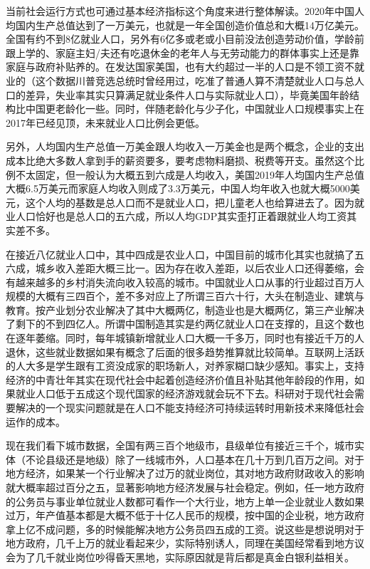 \documentclass[]{tufte-book}
\begin{document}
当前社会运行方式也可通过基本经济指标这个角度来进行整体解读。2020年中国人均国内生产总值达到了一万美元，也就是一年全国创造价值总和大概14万亿美元。全国有约不到8亿就业人口，另外有6亿多或老或小目前没法创造劳动价值，学龄前跟上学的、家庭主妇/夫还有吃退休金的老年人与无劳动能力的群体事实上还是靠家庭与政府补贴养的。在发达国家美国，也有大约超过一半的人口是不领工资不就业的（这个数据川普竞选总统时曾经用过，吃准了普通人算不清楚就业人口与总人口的差异，失业率其实只算满足就业条件人口与实际就业人口），毕竟美国年龄结构比中国更老龄化一些。同时，伴随老龄化与少子化，中国就业人口规模事实上在2017年已经见顶，未来就业人口比例会更低。

另外，人均国内生产总值一万美金跟人均收入一万美金也是两个概念，企业的支出成本比绝大多数人拿到手的薪资要多，要考虑物料磨损、税费等开支。虽然这个比例不太固定，但一般认为大概五到六成是人均收入，美国2019年人均国内生产总值大概6.5万美元而家庭人均收入则成了3.3万美元，中国人均年收入也就大概5000美元，这个人均的基数是总人口而不是就业人口，把儿童老人也给算进去了。因为就业人口恰好也是总人口的五六成，所以人均GDP其实歪打正着跟就业人均工资其实差不多。

在接近八亿就业人口中，其中四成是农业人口，中国目前的城市化其实也就搞了五六成，城乡收入差距大概三比一。因为存在收入差距，以后农业人口还得萎缩，会有越来越多的乡村消失流向收入较高的城市。中国就业人口从事的行业超过百万人规模的大概有三四百个，差不多对应上了所谓三百六十行，大头在制造业、建筑与教育。按产业划分农业解决了其中大概两亿，制造业也是大概两亿，第三产业解决了剩下的不到四亿人。所谓中国制造其实是约两亿就业人口在支撑的，且这个数也在逐年萎缩。同时，每年城镇新增就业人口大概一千多万，同时也有接近千万的人退休，这些就业数据如果有概念了后面的很多趋势推算就比较简单。互联网上活跃的人大多是学生跟有工资没成家的职场新人，对养家糊口缺少感知。事实上，支持经济的中青壮年其实在现代社会中起着创造经济价值且补贴其他年龄段的作用，如果就业人口低于五成这个现代国家的经济游戏就会玩不下去。科研对于现代社会需要解决的一个现实问题就是在人口不能支持经济可持续运转时用新技术来降低社会运作的成本。

现在我们看下城市数据，全国有两三百个地级市，县级单位有接近三千个，城市实体（不论县级还是地级）除了一线城市外，人口基本在几十万到几百万之间。对于地方经济，如果某一个行业解决了过万的就业岗位，其对地方政府财政收入的影响就大概率超过百分之五，显著影响地方经济发展与社会稳定。例如，任一地方政府的公务员与事业单位就业人数都可看作一个大行业，地方上单一企业就业人数如果过万，年产值基本都是大概不低于十亿人民币的规模，按中国的企业税，地方政府拿上亿不成问题，多的时候能解决地方公务员四五成的工资。说这些是想说明对于地方政府，几千上万的就业看起来少，实际特别诱人，同理在美国经常看到地方议会为了几千就业岗位吵得昏天黑地，实际原因就是背后都是真金白银利益相关。
\end{document}
